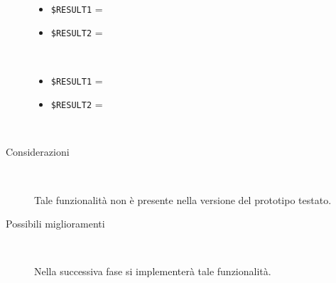 \documentclass[../../SperimentazioniPratiche.tex]{subfiles}
\begin{document}
\begin{tcolorbox}[fonttitle=\bfseries, 
								adjusted title={\Large Prova 3A.1}, 
								breakable, 
								sharp corners=south,
								colback=white, 
								colframe=white!60!black]
\begin{description}[leftmargin=0.7cm,labelwidth=!]
\begin{description}
        					\item[\dispositivoB] \ \par
        					\begin{itemize}
        						\item \verb|$RESULT1| = \ok
        						\item \verb|$RESULT2| = \ok
        					\end{itemize}
        					
        					\item[\dispositivoC] \ \par
        					\begin{itemize}
        						\item \verb|$RESULT1| = \ok
        						\item \verb|$RESULT2| = \ok
        					\end{itemize}
        					
        				\end{description}
        				
        			\tcbline
        			
        			\item[Analisi risultati] \ \par
        				\begin{description}
        					\item[Considerazioni] \ \par
        						Tale funzionalità non è presente nella versione del prototipo testato.
        					
        					\item[Possibili miglioramenti] \ \par 
        						Nella successiva fase si implementerà tale funzionalità.
        				\end{description}
        				
				\end{description}  
				
			\end{tcolorbox}



	
	\newpage	
\end{document}
